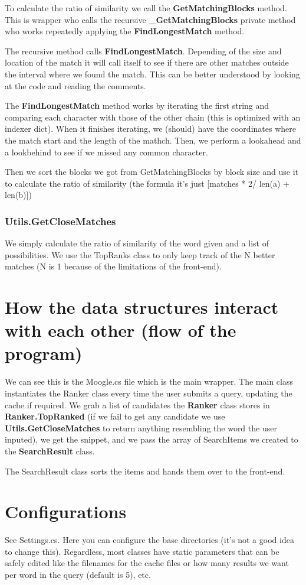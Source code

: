 \documentclass{report}
\begin{document}
To calculate the ratio of similarity we call the \textbf{GetMatchingBlocks} method. This is wrapper who calls the recursive \textbf{\_GetMatchingBlocks} private method who works repeatedly applying the \textbf{FindLongestMatch} method.

The recursive method calls \textbf{FindLongestMatch}. Depending of the size and location of the match it will call itself to see if there are other matches outside the interval where we found the match. This can be better understood by looking at the code and reading the comments.

The \textbf{FindLongestMatch} method works by iterating the first string and comparing each character with those of the other chain (this is optimized with an indexer dict). When it finishes iterating, we (should) have the coordinates where the match start and the length of the mathch. Then, we perform a lookahead and a lookbehind to see if we missed any common character.

Then we sort the blocks we got from GetMatchingBlocks by block size and use it to calculate the ratio of similarity (the formula it's just [matches * 2/ len(a) + len(b)])

\subsection{Utils.GetCloseMatches}

We simply calculate the ratio of similarity of the word given and a list of possibilities. We use the TopRanks class to only keep track of the N better matches (N is 1 because of the limitations of the front-end).

\chapter{How the data structures interact with each other (flow of the program)}

We can see this is the Moogle.cs file which is the main wrapper. The main class instantiates the Ranker class every time the user submits a query, updating the cache if required. We grab a list of candidates the \textbf{Ranker} class stores in \textbf{Ranker.TopRanked} (if we fail to get any candidate we use \textbf{Utils.GetCloseMatches} to return anything resembling the word the user inputed), we get the snippet, and we pass the array of SearchItems we created to the \textbf{SearchResult} class.

The SearchResult class sorts the items and hands them over to the front-end.

\chapter{Configurations}

See Settings.cs. Here you can configure the base directories (it's not a good idea to change this). Regardless, most classes have static parameters that can be safely edited like the filenames for the cache files or how many results we want per word in the query (default is 5), etc.
\end{document}
